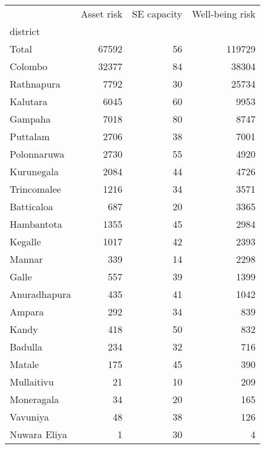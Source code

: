 \begin{tabular}{lrrr}
\toprule
{} &  Asset risk &  SE capacity &  Well-being risk \\
district     &             &              &                  \\
\midrule
Total        &       67592 &           56 &           119729 \\
Colombo      &       32377 &           84 &            38304 \\
Rathnapura   &        7792 &           30 &            25734 \\
Kalutara     &        6045 &           60 &             9953 \\
Gampaha      &        7018 &           80 &             8747 \\
Puttalam     &        2706 &           38 &             7001 \\
Polonnaruwa  &        2730 &           55 &             4920 \\
Kurunegala   &        2084 &           44 &             4726 \\
Trincomalee  &        1216 &           34 &             3571 \\
Batticaloa   &         687 &           20 &             3365 \\
Hambantota   &        1355 &           45 &             2984 \\
Kegalle      &        1017 &           42 &             2393 \\
Mannar       &         339 &           14 &             2298 \\
Galle        &         557 &           39 &             1399 \\
Anuradhapura &         435 &           41 &             1042 \\
Ampara       &         292 &           34 &              839 \\
Kandy        &         418 &           50 &              832 \\
Badulla      &         234 &           32 &              716 \\
Matale       &         175 &           45 &              390 \\
Mullaitivu   &          21 &           10 &              209 \\
Moneragala   &          34 &           20 &              165 \\
Vavuniya     &          48 &           38 &              126 \\
Nuwara Eliya &           1 &           30 &                4 \\
\bottomrule
\end{tabular}
